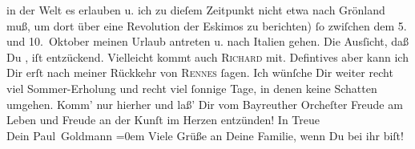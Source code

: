 \begin{ledgroupsized}[t]{13cm}
               in der Welt es erlauben u. ich zu dieſem Zeitpunkt nicht etwa nach Grönland muß, um dort über eine Revolution der Eskimos zu
               berichten) ſo zwiſchen dem 5. und 10. Oktober
               meinen Urlaub {\pb}antreten u. nach Italien gehen. Die Ausſicht, daß Du \label{K_L02881-8v}\label{K_L02881-8h}, iſt entzückend. Vielleicht kommt auch \textsc{Richard} mit. Defintives aber kann ich Dir erſt nach meiner Rückkehr von \textsc{Rennes} ſagen.\pend
           \pstart
           Ich wünſche Dir weiter recht viel Sommer-Erholung und recht viel ſonnige Tage, in
               denen keine Schatten umgehen. Komm’ nur hierher und laß’ Dir vom Bayreuther Orcheſter Freude am Leben und
               Freude an der Kunſt  im Herzen entzünden!\pend
           \pstart
           In Treue {\\[\baselineskip]}Dein \spacefill\mbox{Paul Goldmann}\pend
           \leftskip=0em{}\pstart
           \noindent{}{\pb}Viele Grüße an Deine Familie, wenn Du bei ihr
                  biſt!\pend
           
         
         \endnumbering{}\end{ledgroupsized}  \newcommand{\dateiname}{L02881}\newcommand{\titel}{Paul Goldmann an Arthur Schnitzler, 27. 7. [1899]}\newcommand{\editorInnen}{Martin Anton Müller und Laura Untner}
      